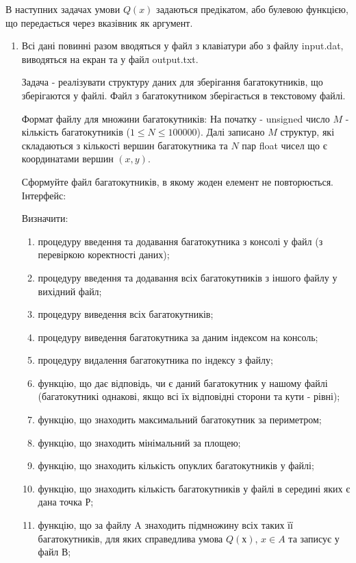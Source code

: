 \documentclass[]{article}
\makeatletter
\newcommand{\xslalph}[1]{\expandafter\@xslalph\csname c@#1\endcsname}
\newcommand{\@xslalph}[1]{%
    \ifcase#1\or а\or б\or в\or г\or д\or e\or є\or ж\or з\or i%
    \or й\or к\or л\or м\or н\or о\or п\or р\or с\or т%
    \or у\or ф\or х\or ц\or ч\or ш\or ю\or я\or аа\or бб\or вв %
    \else\@ctrerr\fi%
}
\makeatother
\begin{document}
В наступних задачах умови $Q(x)$ задаються предікатом, або 
булевою функцією, що передається через вказівник як аргумент.
\begin{enumerate}
\item 

Всі дані повинні разом вводяться у файл з клавіатури або з файлу input.dat, 
виводяться на екран та у файл output.txt.

Задача - реалізувати структуру даних для зберігання багатокутників, що зберігаются у файлі. 
Файл з багатокутником зберігається в текстовому файлі.

Формат файлу для множини багатокутників:
На початку - unsigned число $M$ - кількість багатокутників ($1 \le N \le 100000$). Далі
записано $M$ структур, які складаються з кількості вершин багатокутника та $N$ пар float чисел 
що є координатами вершин $(x,y)$.

Сформуйте файл багатокутників, в якому жоден елемент не повторюється.
Інтерфейс:

Визначити:
\begin{enumerate}[label=\xslalph*)]
\item процедуру введення та додавання багатокутника з консолі у файл (з перевіркою коректності даних);
\item процедуру введення та додавання всіх багатокутників з іншого файлу у вихідний файл;
\item процедуру виведення всіх багатокутників;
\item процедуру виведення багатокутника за даним індексом на консоль;
\item процедуру видалення багатокутника по індексу з файлу;
\item функцію, що дає відповідь, чи є даний багатокутник у нашому файлі (багатокутникі однакові, якщо всі їх відповідні сторони та кути - рівні);
\item функцію, що знаходить максимальний багатокутник за периметром;
\item функцію, що знаходить мінімальний за площею;
\item функцію, що знаходить кількість опуклих багатокутників у файлі;
\item функцію, що знаходить кількість багатокутників у файлі в середині яких є дана точка Р;
\item функцію, що за файлу A знаходить підмножину всіх таких її
багатокутників, для яких справедлива умова $Q(х)$, $x\in A$ та записує у файл В;

\end{enumerate}



\end{enumerate}
\end{document}
